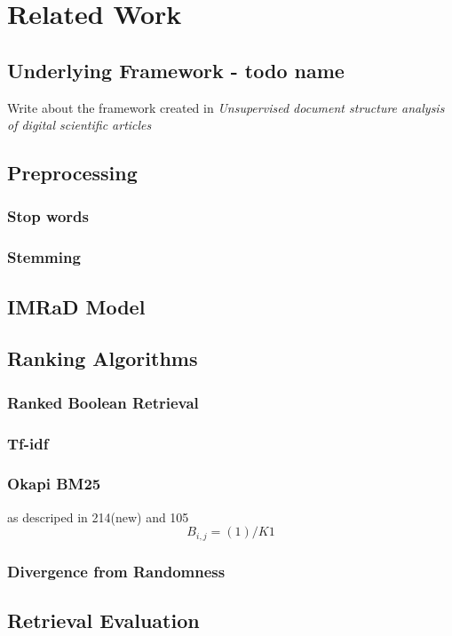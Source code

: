 \chapter{Related Work}
\label{cha:related_work}

\section{Underlying Framework - todo name}
\label{sec:underlying-framework}

Write about the framework created in \textit{Unsupervised document structure analysis of digital scientific articles}

\section{Preprocessing}
\label{sec:preprocessing}

\subsection{Stop words}
\label{sec:stop_words}

\subsection{Stemming}
\label{sec:stemming}

\section{IMRaD Model}
\label{sec:imrad-model}


\section{Ranking Algorithms}
\label{sec:ranking_algorithms}

\subsection{Ranked Boolean Retrieval}
\label{sec:ranked_boolean_retrieval}

\subsection{Tf-idf}
\label{sec:tfidf}

\subsection{Okapi BM25}
\label{sec:okapi_bm25}
as descriped in 214(new) and 105 ~\cite{ModernInvormationRetrieval1999} \\
\begin{equation}
  B_{i,j} = {(1)}/{K1}
\end{equation}

\subsection{Divergence from Randomness}
\label{sec:divergence_from_randomness}

\section{Retrieval Evaluation}
\label{sec:retrieval_evaluation}
